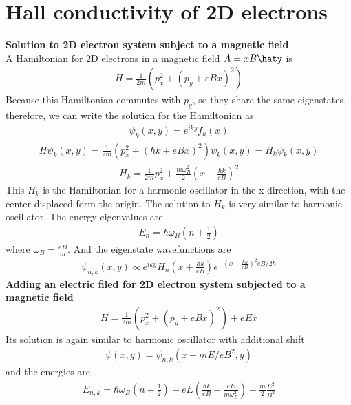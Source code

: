 \documentclass[a4paper]{article}
\begin{document}
\section{Hall conductivity of 2D electrons }
{\bf Solution to 2D electron system subject to a magnetic field}\\
A Hamiltonian for 2D electrons in a magnetic field $A = xB\haty$ is\\
\begin{align*}
	H = \frac{1}{2m} (p_x^2 + (p_y + eBx)^2)
\end{align*}
Because this Hamiltonian commutes with $p_y$, so they share the same eigenstates, therefore, we can write the
solution for the Hamiltonian as
\begin{align*}
	\psi_k(x, y) = e^{iky}f_k(x)
\end{align*}
\begin{align*}
	H \psi_k(x, y) = \frac{1}{2m} (p_x^2 +(\hbar k + eBx)^2) \psi_k(x, y) = H_k \psi_k(x, y)
\end{align*}
\begin{align*}
		H_k = \frac{1}{2m} p_x^2 +\frac{m \omega_B^2}{2} (x+ \frac{\hbar k}{eB})^2
\end{align*}
This $H_k$ is the Hamiltonian for a harmonic oscillator in the x direction, with the center displaced form the origin. The solution to $H_k$ is very similar to harmonic oscillator. The energy eigenvalues are
\begin{align*}
	E_n = \hbar \omega_B (n + \frac{1}{2})
\end{align*}
where $\omega_B = \frac{eB}{m}$. And the eigenstate wavefunctions are
\begin{align*}
	\psi_{n,k}(x, y) \propto e^{iky} H_n(x + \frac{\hbar k}{eB})e^{-(x+ \frac{\hbar k}{eB})^2eB/2\hbar}
\end{align*}
{\bf Adding an electric filed for 2D electron system subjected to a magnetic field}\\
\begin{align*}
	H = \frac{1}{2m} (p_x^2 + (p_y + eBx)^2) + eEx
\end{align*}
Its solution is again similar to harmonic oscillator with additional shift
\begin{align*}
	\psi(x, y) = \psi_{n,k}(x+ mE/eB^2, y)	
\end{align*}
and the energies are 
\begin{align*}
	E_{n,k} = \hbar \omega_B (n+ \frac{1}{2}) -eE(\frac{\hbar k}{eB}+\frac{eE}{m\omega_B^2})+\frac{m}{2}\frac{E^2}{B^2}
\end{align*}
\end{document}
